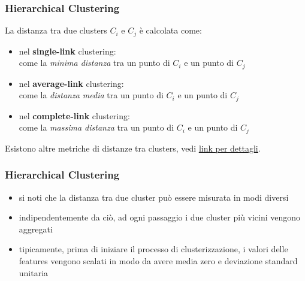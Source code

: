 \begin{frame}

	\frametitle{{\color{GradientDescentDiagramGreen}Hierarchical Clustering}}

	\begin{block}{La distanza tra due clusters $C_i$ e $C_j$ è calcolata come:}
		\begin{itemize}
			\item nel \textbf{single-link} clustering:\\
				come la \textit{minima distanza} tra un punto di $C_i$ e un punto di $C_j$\\
				\vspace{0.5mm}
			\item nel \textbf{average-link} clustering:\\
				come la \textit{distanza media} tra un punto di $C_i$ e un punto di $C_j$\\
				\vspace{0.5mm}
			\item nel \textbf{complete-link} clustering:\\
				come la \textit{massima distanza} tra un punto di $C_i$ e un punto di $C_j$\\
		\end{itemize}
		Esistono altre metriche di distanze tra clusters, vedi \underline{\href{https://uc-r.github.io/hc_clustering}{link per dettagli}}.
	\end{block}

\end{frame}


\begin{frame}

	\frametitle{{\color{GradientDescentDiagramGreen}Hierarchical Clustering}}

		\begin{itemize}
			\item si noti che la distanza tra due cluster può essere misurata in modi diversi
			\item indipendentemente da ciò, ad ogni passaggio i due cluster più vicini vengono aggregati
			\item tipicamente, prima di iniziare il processo di clusterizzazione, i valori delle features vengono scalati in modo da avere media zero e deviazione standard unitaria
		\end{itemize}


\end{frame}


